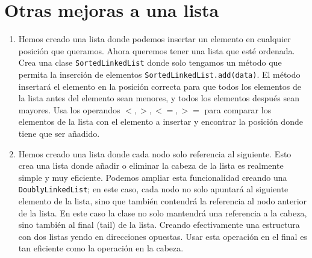 \documentclass[10pt,a4paper]{article}
\begin{document}
\FloatBarrier

\newpage

\section*{Otras mejoras a una lista}

\begin{enumerate}
	\item Hemos creado una lista donde podemos insertar un elemento en cualquier posición que queramos. Ahora queremos tener una lista que esté ordenada. Crea una clase \texttt{SortedLinkedList} donde solo tengamos un método que permita la inserción de elementos \texttt{SortedLinkedList.add(data)}. El método insertará el elemento en la posición correcta para que todos los elementos de la lista antes del elemento sean menores, y todos los elementos después sean mayores. Usa los operandos $<, >, <=, >=$ para comparar los elementos de la lista con el elemento a insertar y encontrar la posición donde tiene que ser añadido.
	\item Hemos creado una lista donde cada nodo solo referencia al siguiente. Esto crea una lista donde añadir o eliminar la cabeza de la lista es realmente simple y muy eficiente. Podemos ampliar esta funcionalidad creando una \texttt{DoublyLinkedList}; en este caso, cada nodo no solo apuntará al siguiente elemento de la lista, sino que también contendrá la referencia al nodo anterior de la lista. En este caso la clase no solo mantendrá una referencia a la cabeza, sino también al final (tail) de la lista. Creando efectivamente una estructura con dos listas yendo en direcciones opuestas. Usar esta operación en el final es tan eficiente como la operación en la cabeza.
    \begin{figure}[h!bt]
	\begin{center}
	\shorthandoff{>}
	\end{center}
    \end{figure}
\end{enumerate}
\end{document}
